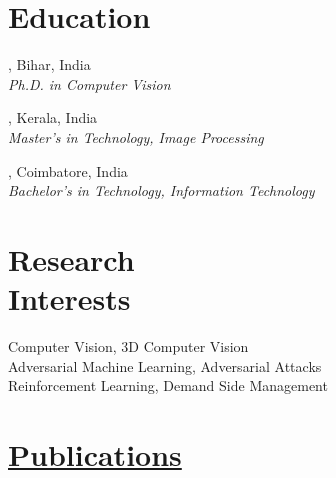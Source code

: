 \documentclass[mm]{simple_style}
\begin{document}
\begin{resume}

\section{Education}
, Bihar, India \\
{\sl Ph.D. in Computer Vision} \\

, Kerala, India \\
{\sl Master’s in Technology, Image Processing} \\

, Coimbatore, India \\
{\sl Bachelor’s in Technology, Information Technology} 

\sectionline

\section{Research\\Interests}
\par
Computer Vision, 3D Computer Vision \\
Adversarial Machine Learning, Adversarial Attacks\\
Reinforcement Learning, Demand Side Management\\
\halfsectionline
\vspace{-8mm}
\section{\href{https://alwynm.github.io/pub}{Publications}}

\vspace{-3.5ex}

\end{resume}
\end{document}

